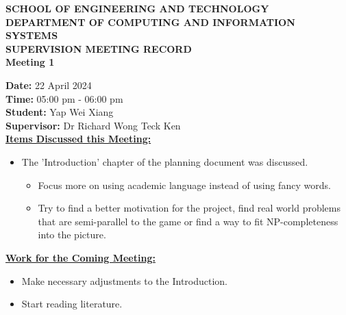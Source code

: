 \documentclass[a4paper, 12pt]{report}
\begin{document}
	
	\onehalfspacing
	
	\begin{center}
		
		\textbf{\large SCHOOL OF ENGINEERING AND TECHNOLOGY}	\\
		\textbf{\small DEPARTMENT OF COMPUTING AND INFORMATION SYSTEMS} \\
		\vspace{1cm}
		\textbf{\LARGE SUPERVISION MEETING RECORD}\\
		\textbf{\normalsize Meeting 1}	%
		
	\end{center}
	
	\noindent			%
	\textbf{Date: } 22 April 2024 \\	%
	\textbf{Time: } 05:00 pm - 06:00 pm \\	%
	\textbf{Student: } Yap Wei Xiang \\
	\textbf{Supervisor: } Dr Richard Wong Teck Ken \\
	
	\noindent			%
	\textbf{\underline{Items Discussed this Meeting: }}
	\begin{itemize}	%
		\item The 'Introduction' chapter of the planning document was discussed.
		
		\begin{itemize}
			\item Focus more on using academic language instead of using fancy words. 
			\item Try to find a better motivation for the project, find real world problems that are semi-parallel to the game or find a way to fit NP-completeness into the picture.
		\end{itemize}
		
	\end{itemize}
	
	\noindent			%
	\textbf{\underline{Work for the Coming Meeting: }}
	\begin{itemize}	%
		\item Make necessary adjustments to the Introduction.
		\item Start reading literature.
	\end{itemize}
	
	\vfill
	
	
\end{document}
